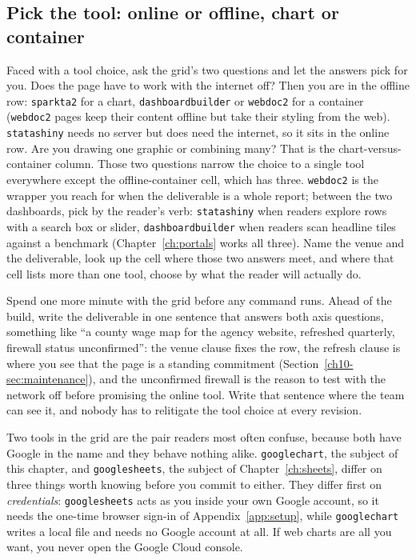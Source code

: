 \subsection{Pick the tool: online or offline, chart or container}\label{sec:suite-choose}
Faced with a tool choice, ask the grid's two questions and let the answers pick for you. Does the page have to work with the internet off? Then you are in the offline row: \texttt{sparkta2} for a chart, \texttt{dashboardbuilder} or \texttt{webdoc2} for a container (\texttt{webdoc2} pages keep their content offline but take their styling from the web). \texttt{statashiny} needs no server but does need the internet, so it sits in the online row. Are you drawing one graphic or combining many? That is the chart-versus-container column. Those two questions narrow the choice to a single tool everywhere except the offline-container cell, which has three. \texttt{webdoc2} is the wrapper you reach for when the deliverable is a whole report; between the two dashboards, pick by the reader's verb: \texttt{statashiny} when readers explore rows with a search box or slider, \texttt{dashboardbuilder} when readers scan headline tiles against a benchmark (Chapter~\ref{ch:portals} works all three). Name the venue and the deliverable, look up the cell where those two answers meet, and where that cell lists more than one tool, choose by what the reader will actually do.

Spend one more minute with the grid before any command runs. Ahead of the build, write the deliverable in one sentence that answers both axis questions, something like \enquote{a county wage map for the agency website, refreshed quarterly, firewall status unconfirmed}: the venue clause fixes the row, the refresh clause is where you see that the page is a standing commitment (Section~\ref{ch10-sec:maintenance}), and the unconfirmed firewall is the reason to test with the network off before promising the online tool. Write that sentence where the team can see it, and nobody has to relitigate the tool choice at every revision.

Two tools in the grid are the pair readers most often confuse, because both have Google in the name and they behave nothing alike. \texttt{googlechart}, the subject of this chapter, and \texttt{googlesheets}, the subject of Chapter~\ref{ch:sheets}, differ on three things worth knowing before you commit to either. They differ first on \emph{credentials}: \texttt{googlesheets} acts as you inside your own Google account, so it needs the one-time browser sign-in of Appendix~\ref{app:setup}, while \texttt{googlechart} writes a local file and needs no Google account at all. If web charts are all you want, you never open the Google Cloud console.

